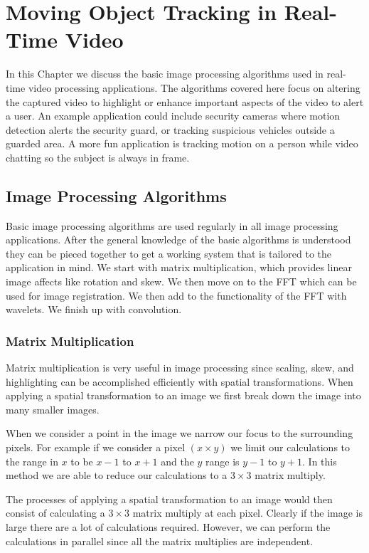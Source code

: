 \chapter{Moving Object Tracking in Real-Time Video}

In this Chapter we discuss the basic image processing algorithms used in real-time video processing applications. The algorithms covered here focus on altering the captured video to highlight or enhance important aspects of the video to alert a user. An example application could include security cameras where motion detection alerts the security guard, or tracking suspicious vehicles outside a guarded area. A more fun application is tracking motion on a person while video chatting so the subject is always in frame. 

	
\section{Image Processing Algorithms}

Basic image processing algorithms are used regularly in all image processing applications. After the general knowledge of the basic algorithms is understood they can be pieced together to get a working system that is tailored to the application in mind. We start with matrix multiplication, which provides linear image affects like rotation and skew. We then move on to the \ac{FFT} which can be used for image registration. We then add to the functionality of the \ac{FFT} with wavelets. We finish up with convolution.
	
\subsection{Matrix Multiplication}

Matrix multiplication is very useful in image processing since scaling, skew, and highlighting can be accomplished efficiently with spatial transformations. When applying a spatial transformation to an image we first break down the image into many smaller images. 

When we consider a point in the image we narrow our focus to the surrounding pixels. For example if we consider a pixel $(x\times y)$ we limit our calculations to the range in $x$ to be $x-1$ to $x+1$ and the $y$ range is $y-1$ to $y+1$. In this method we are able to reduce our calculations to a $3 \times 3$ matrix multiply. 

The processes of applying a spatial transformation to an image would then consist of calculating a $3 \times 3$ matrix multiply at each pixel. Clearly if the image is large there are a lot of calculations required. However, we can perform the calculations in parallel since all the matrix multiplies are independent.

